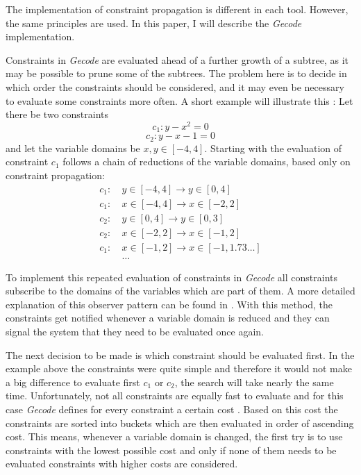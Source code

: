 \documentclass[10pt,
               a4paper,
               journal,
               ]{IEEEtran}
\begin{document}
	The implementation of constraint propagation is different in each tool. However, the same principles are used. In this paper, I will describe the \emph{Gecode} implementation.
	
	Constraints in \emph{Gecode} are evaluated ahead of a further growth of a subtree, as it may be possible to prune some of the subtrees. The problem here is to decide in which order the constraints should be considered, and it may even be necessary to evaluate some constraints more often. A short example will illustrate this \cite[p.~575]{handbookCP}: Let there be two constraints 
	\begin{equation}
		c_1: y - x^2 = 0
	\end{equation}
	\begin{equation}
		c_2: y - x - 1 = 0
		\label{eq:linear}
	\end{equation}
	and let the variable domains be $x, y \in [-4, 4]$. Starting with the evaluation of constraint $c_1$ follows a chain of reductions of the variable domains, based only on constraint propagation:
	\begin{equation}
	\begin{split}
		c_1:\ &y \in [-4, 4] \rightarrow y \in [0, 4] \\
		c_1:\ &x \in [-4, 4] \rightarrow x \in [-2, 2] \\
		c_2:\ &y \in [0, 4] \rightarrow y \in [0, 3] \\
		c_2:\ &x \in [-2, 2] \rightarrow x \in [-1, 2] \\
		c_1:\ &x \in [-1, 2] \rightarrow x \in [-1, 1.73 \dots] \\
		&\dots
	\end{split}
	\end{equation}
	
	To implement this repeated evaluation of constraints in \emph{Gecode} all constraints subscribe to the domains of the variables which are part of them. A more detailed explanation of this observer pattern can be found in \cite{designPatterns}. With this method, the constraints get notified whenever a variable domain is reduced and they can signal the system that they need to be evaluated once again.
	
	The next decision to be made is which constraint should be evaluated first. In the example above the constraints were quite simple and therefore it would not make a big difference to evaluate first $c_1$ or $c_2$, the search will take nearly the same time. Unfortunately, not all constraints are equally fast to evaluate and for this case \emph{Gecode} defines for every constraint a certain cost \cite[p.~275]{programmingGecode}. Based on this cost the constraints are sorted into buckets which are then evaluated in order of ascending cost. This means, whenever a variable domain is changed, the first try is to use constraints with the lowest possible cost and only if none of them needs to be evaluated constraints with higher costs are considered.
	
\end{document}
